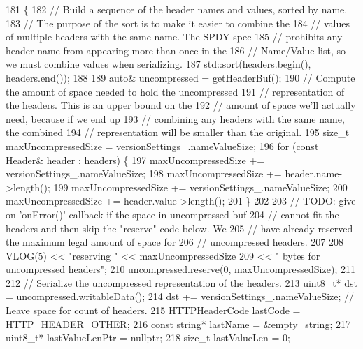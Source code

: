 \begin{DoxyCode}
181                                                                           \{
182   \textcolor{comment}{// Build a sequence of the header names and values, sorted by name.}
183   \textcolor{comment}{// The purpose of the sort is to make it easier to combine the}
184   \textcolor{comment}{// values of multiple headers with the same name.  The SPDY spec}
185   \textcolor{comment}{// prohibits any header name from appearing more than once in the}
186   \textcolor{comment}{// Name/Value list, so we must combine values when serializing.}
187   std::sort(headers.begin(), headers.end());
188 
189   \textcolor{keyword}{auto}& uncompressed = getHeaderBuf();
190   \textcolor{comment}{// Compute the amount of space needed to hold the uncompressed}
191   \textcolor{comment}{// representation of the headers.  This is an upper bound on the}
192   \textcolor{comment}{// amount of space we'll actually need, because if we end up}
193   \textcolor{comment}{// combining any headers with the same name, the combined}
194   \textcolor{comment}{// representation will be smaller than the original.}
195   \textcolor{keywordtype}{size\_t} maxUncompressedSize = versionSettings_.nameValueSize;
196   \textcolor{keywordflow}{for} (\textcolor{keyword}{const} Header& header : headers) \{
197     maxUncompressedSize += versionSettings_.nameValueSize;
198     maxUncompressedSize += header.name->length();
199     maxUncompressedSize += versionSettings_.nameValueSize;
200     maxUncompressedSize += header.value->length();
201   \}
202 
203   \textcolor{comment}{// TODO: give on 'onError()' callback if the space in uncompressed buf}
204   \textcolor{comment}{// cannot fit the headers and then skip the "reserve" code below. We}
205   \textcolor{comment}{// have already reserved the maximum legal amount of space for}
206   \textcolor{comment}{// uncompressed headers.}
207 
208   VLOG(5) << \textcolor{stringliteral}{"reserving "} << maxUncompressedSize
209           << \textcolor{stringliteral}{" bytes for uncompressed headers"};
210   uncompressed.reserve(0, maxUncompressedSize);
211 
212   \textcolor{comment}{// Serialize the uncompressed representation of the headers.}
213   uint8\_t* dst = uncompressed.writableData();
214   dst += versionSettings_.nameValueSize; \textcolor{comment}{// Leave space for count of headers.}
215   HTTPHeaderCode lastCode = HTTP_HEADER_OTHER;
216   \textcolor{keyword}{const} \textcolor{keywordtype}{string}* lastName = &empty_string;
217   uint8\_t* lastValueLenPtr = \textcolor{keyword}{nullptr};
218   \textcolor{keywordtype}{size\_t} lastValueLen = 0;

\end{DoxyCode}
